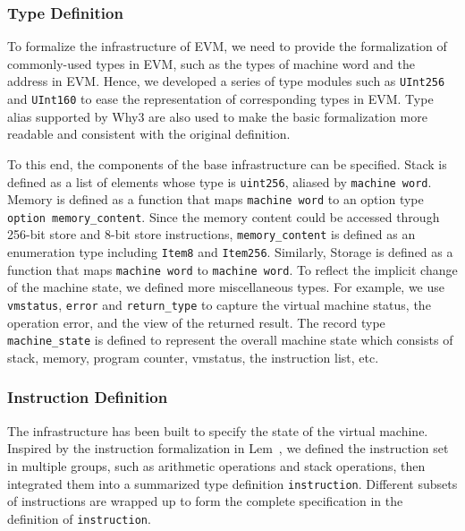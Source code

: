 \documentclass[runningheads]{llncs}
\begin{document}
\subsubsection{Type Definition}\label{sec:type}

To formalize the infrastructure of EVM, we need to provide the formalization of commonly-used types in EVM, such as the types of machine word and the address in EVM. Hence, we developed a series of type modules such as \texttt{UInt256} and \texttt{UInt160} to ease the representation of corresponding types in EVM. Type alias supported by Why3 are also used to make the basic formalization more readable and consistent with the original definition. 

To this end, the components of the base infrastructure can be specified. Stack is defined as a list of elements whose type is \texttt{uint256}, aliased by \texttt{machine word}. Memory is defined as a function that maps \texttt{machine word} to an option type \texttt{option memory\_content}. Since the memory content could be accessed through 256-bit store and 8-bit store instructions, \texttt{memory\_content} is defined as an enumeration type including \texttt{Item8} and \texttt{Item256}. Similarly, Storage is defined as a function that maps \texttt{machine word} to \texttt{machine word}. To reflect the implicit change of the machine state, we defined more miscellaneous types. For example, we use \texttt{vmstatus}, \texttt{error} and \texttt{return\_type} to capture the virtual machine status, the operation error, and the view of the returned result. The record type \texttt{machine\_state} is defined to represent the overall machine state which consists of stack, memory, program counter, vmstatus, the instruction list, etc.

\subsubsection{Instruction Definition}\label{sec:instruction}
The infrastructure has been built to specify the state of the virtual machine. %
Inspired by the instruction formalization in Lem~\cite{hirai2017defining}, we defined the instruction set in multiple groups, such as arithmetic operations and stack operations, then integrated them into a summarized type definition \texttt{instruction}. %
Different subsets of instructions are wrapped up to form the complete specification in the definition of \texttt{instruction}.
\end{document}

